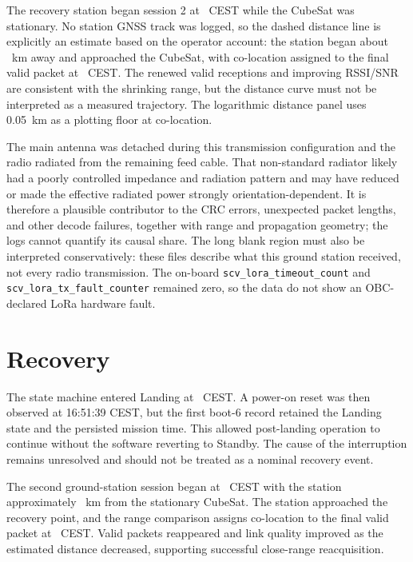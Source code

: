 \documentclass[11pt,a4paper]{article}
\begin{document}
The recovery station began session 2 at \SessionTwoStartTime\ CEST while the
CubeSat was stationary. No station GNSS track was logged, so the dashed distance
line is explicitly an estimate based on the operator account: the station began
about \SessionTwoStartRangeKm\ km away and approached the CubeSat, with
co-location assigned to the final valid packet at \SessionTwoEndTime\ CEST.
The renewed valid receptions and improving RSSI/SNR are consistent with the
shrinking range, but the distance curve must not be interpreted as a measured
trajectory. The logarithmic distance panel uses 0.05~km as a plotting floor at
co-location.

The main antenna was detached during this transmission configuration and the
radio radiated from the remaining feed cable. That non-standard radiator likely
had a poorly controlled impedance and radiation pattern and may have reduced or
made the effective radiated power strongly orientation-dependent. It is therefore
a plausible contributor to the CRC errors, unexpected packet lengths, and other
decode failures, together with range and propagation geometry; the logs cannot
quantify its causal share. The long blank region must also be interpreted
conservatively: these files describe what this ground station received, not every
radio transmission. The on-board \texttt{scv\_lora\_timeout\_count} and
\texttt{scv\_lora\_tx\_fault\_counter} remained zero, so the data do not show an
OBC-declared LoRa hardware fault.

\clearpage
\section{Recovery}

The state machine entered Landing at \LandingTime\ CEST. A power-on reset was
then observed at 16:51:39 CEST, but the first boot-6 record retained the Landing
state and the persisted mission time. This allowed post-landing operation to
continue without the software reverting to Standby. The cause of the
interruption remains unresolved and should not be treated as a nominal recovery
event.

The second ground-station session began at \SessionTwoStartTime\ CEST with the
station approximately \SessionTwoStartRangeKm~km from the stationary CubeSat.
The station approached the recovery point, and the range comparison assigns
co-location to the final valid packet at \SessionTwoEndTime\ CEST. Valid packets
reappeared and link quality improved as the estimated distance decreased,
supporting successful close-range reacquisition.
\end{document}

